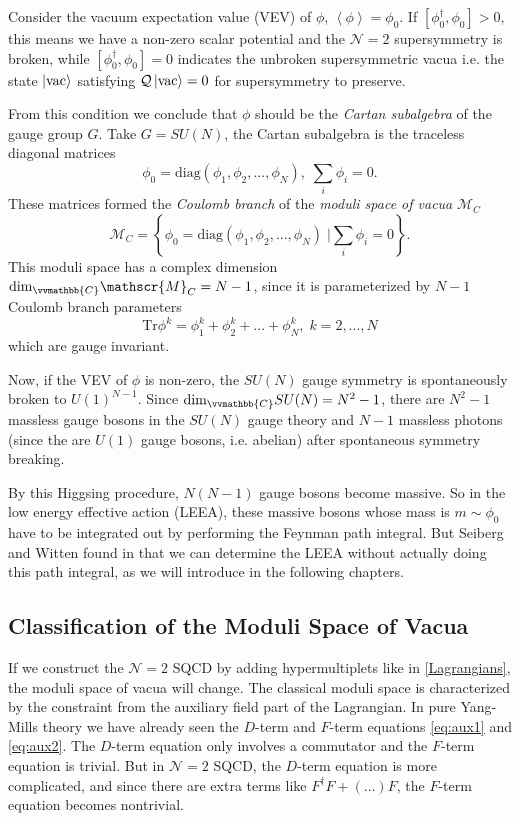 \documentclass{article}
\begin{document}
Consider the vacuum expectation value (VEV) of $\phi$, $\left<\phi\right>=\phi_0$. If $[\phi_0^\dagger,\phi_0]>0$, this means we have a non-zero scalar potential and the $\mathcal{N}=2$ supersymmetry is broken, while $[\phi_0^\dagger,\phi_0]=0$ indicates the unbroken supersymmetric vacua i.e. the state $\ket{\mathrm{vac}}$ satisfying $\mathcal{Q}\ket{\mathrm{vac}}=0$ for supersymmetry to preserve. 

From this condition we conclude that $\phi$ should be the \textit{Cartan subalgebra} of the gauge group $G$. Take $G=SU(N)$, the Cartan subalgebra is the traceless diagonal matrices
\begin{equation}
    \phi_0=\mathrm{diag}(\phi_1,\phi_2,...,\phi_N),\;\sum_i \phi_i=0.
\end{equation}
These matrices formed the \textit{Coulomb branch} of the \textit{moduli space of vacua} $\mathscr{M}_C$
\begin{equation}
    \mathscr{M}_C=\left\{\phi_0=\mathrm{diag}(\phi_1,\phi_2,...,\phi_N)\;|\sum_i \phi_i=0\right\}.
\end{equation}
This moduli space has a complex dimension $\mathrm{dim}_{\vvmathbb{C}}\mathscr{M}_C=N-1$, since it is parameterized by $N-1$ Coulomb branch parameters
\begin{equation}
\label{eq:ginv}
    \mathrm{Tr}\phi^k=\phi_1^k+\phi_2^k+...+\phi_N^k,\;k=2,...,N
\end{equation}
which are gauge invariant.

Now, if the VEV of $\phi$ is non-zero, the $SU(N)$ gauge symmetry is spontaneously broken to $U(1)^{N-1}$. Since $\mathrm{dim}_{\vvmathbb{C}}SU(N)=N^2-1$, there are $N^2-1$ massless gauge bosons in the $SU(N)$ gauge theory and $N-1$ massless photons (since the are $U(1)$ gauge bosons, i.e. abelian) after spontaneous symmetry breaking. 

By this Higgsing procedure, $N(N-1)$ gauge bosons become massive. So in the low energy effective action (LEEA), these massive bosons whose mass is $m\sim \phi_0$ have to be integrated out by performing the Feynman path integral. But Seiberg and Witten found in \cite{Sei94} that we can determine the LEEA without actually doing this path integral, as we will introduce in the following chapters.

\subsection{Classification of the Moduli Space of Vacua}
If we construct the $\mathcal{N}=2$ SQCD by adding hypermultiplets like in \ref{Lagrangians}, the moduli space of vacua will change. The classical moduli space is characterized by the constraint from the auxiliary field part of the Lagrangian. In pure Yang-Mills theory we have already seen the $D$-term and $F$-term equations \eqref{eq:aux1} and \eqref{eq:aux2}. The $D$-term equation only involves a commutator and the $F$-term equation is trivial. But in $\mathcal{N}=2$ SQCD, the $D$-term equation is more complicated, and since there are extra terms like $F^{\dagger}F+(...)F$, the $F$-term equation becomes nontrivial.
\end{document}

